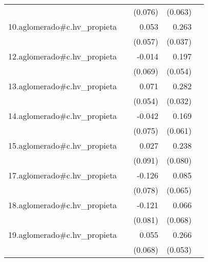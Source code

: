 {\begin{longtable}{l*{4}{D{.}{.}{-1}}}
            &                     &     (0.076)         &     (0.063)         &                     \\
\addlinespace
10.aglomerado#c.hv\_propieta&                     &       0.053         &       0.263\sym{***}&                     \\
            &                     &     (0.057)         &     (0.037)         &                     \\
\addlinespace
12.aglomerado#c.hv\_propieta&                     &      -0.014         &       0.197\sym{***}&                     \\
            &                     &     (0.069)         &     (0.054)         &                     \\
\addlinespace
13.aglomerado#c.hv\_propieta&                     &       0.071         &       0.282\sym{***}&                     \\
            &                     &     (0.054)         &     (0.032)         &                     \\
\addlinespace
14.aglomerado#c.hv\_propieta&                     &      -0.042         &       0.169\sym{**} &                     \\
            &                     &     (0.075)         &     (0.061)         &                     \\
\addlinespace
15.aglomerado#c.hv\_propieta&                     &       0.027         &       0.238\sym{**} &                     \\
            &                     &     (0.091)         &     (0.080)         &                     \\
\addlinespace
17.aglomerado#c.hv\_propieta&                     &      -0.126         &       0.085         &                     \\
            &                     &     (0.078)         &     (0.065)         &                     \\
\addlinespace
18.aglomerado#c.hv\_propieta&                     &      -0.121         &       0.066         &                     \\
            &                     &     (0.081)         &     (0.068)         &                     \\
\addlinespace
19.aglomerado#c.hv\_propieta&                     &       0.055         &       0.266\sym{***}&                     \\
            &                     &     (0.068)         &     (0.053)         &                     \\

\end{longtable}}
